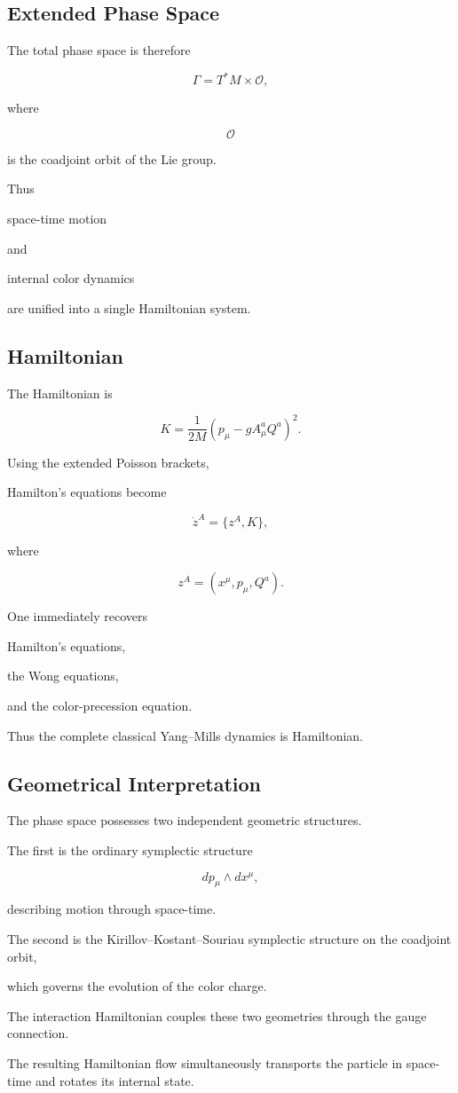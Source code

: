 \subsection{Extended Phase Space}

The total phase space is therefore

\[
\boxed{
\Gamma
=
T^*M
\times
\mathcal O,
}
\]

where

\[
\mathcal O
\]

is the coadjoint orbit of the Lie group.

Thus

space-time motion

and

internal color dynamics

are unified into a single Hamiltonian system.


\subsection{Hamiltonian}

The Hamiltonian is

\[
\boxed{
K
=
\frac1{2M}
(p_\mu-gA_\mu^aQ^a)^2.
}
\]

Using the extended Poisson brackets,

Hamilton's equations become

\[
\dot z^A
=
\{z^A,K\},
\]

where

\[
z^A
=
(x^\mu,p_\mu,Q^a).
\]

One immediately recovers

Hamilton's equations,

the Wong equations,

and the color-precession equation.

Thus the complete classical Yang--Mills dynamics is Hamiltonian.


\subsection{Geometrical Interpretation}

The phase space possesses two independent geometric structures.

The first is the ordinary symplectic structure

\[
dp_\mu
\wedge
dx^\mu,
\]

describing motion through space-time.

The second is the Kirillov--Kostant--Souriau symplectic structure on the
coadjoint orbit,

which governs the evolution of the color charge.

The interaction Hamiltonian couples these two geometries through the
gauge connection.

The resulting Hamiltonian flow simultaneously transports the particle in
space-time and rotates its internal state.




